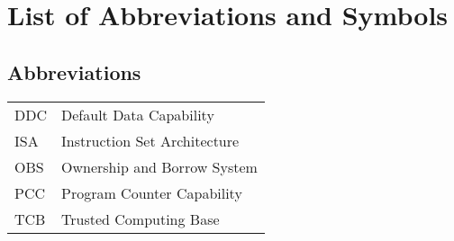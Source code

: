 \documentclass[master=cws,masteroption=vs]{kulemt}
\begin{document}
\chapter{List of Abbreviations and Symbols}
\section*{Abbreviations}
\begin{flushleft}
  \renewcommand{\arraystretch}{1.1}
  \begin{tabularx}{\textwidth}{@{}p{12mm}X@{}}
    DDC   & Default Data Capability \\
    ISA   & Instruction Set Architecture \\
    OBS   & Ownership and Borrow System \\
    PCC   & Program Counter Capability \\
    TCB   & Trusted Computing Base \\
  \end{tabularx}
\end{flushleft}

\mainmatter










\appendixpage*          %
\appendix



\backmatter


\end{document}
